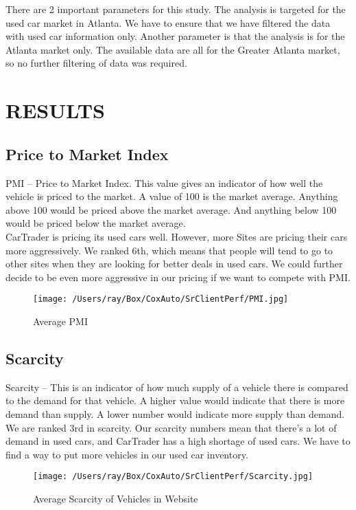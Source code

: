 \documentclass[
	12pt, %
	letterpaper, %
]{tPlate}
\begin{document}
There are 2 important parameters for this study.  The analysis is targeted for the used car market in Atlanta. We have to ensure that we have filtered the data with used car information only.  Another parameter is that the analysis is for the Atlanta market only.  The available data are all for the Greater Atlanta market, so no further filtering of data was required.

\section{RESULTS} 
\subsection{Price to Market Index}
PMI – Price to Market Index.  This value gives an indicator of how well the vehicle is priced to the market.  A value of 100 is the market average.  Anything above 100 would be priced above the market average.  And anything below 100 would be priced below the market average. \\

CarTrader is pricing its used cars well. However, more Sites are pricing their cars more aggressively.  We ranked 6th, which means that people will tend to go to other sites when they are looking for better deals in used cars.  We could further decide to be even more aggressive in our pricing if we want to compete with PMI.

\begin{figure}[H]
	\centering
	\texttt{[image: /Users/ray/Box/CoxAuto/SrClientPerf/PMI.jpg]}
	\caption[Optional caption]{Average PMI}
	\label{fig. 2}
\end{figure}

\subsection{Scarcity}
Scarcity – This is an indicator of how much supply of a vehicle there is compared to the demand for that vehicle.  A higher value would indicate that there is more demand than supply.  A lower number would indicate more supply than demand.\\

We are ranked 3rd in scarcity.  Our scarcity numbers mean that there's a lot of demand in used cars, and CarTrader has a high shortage of used cars.  We have to find a way to put more vehicles in our used car inventory.  

\begin{figure}[H]
	\centering
	\texttt{[image: /Users/ray/Box/CoxAuto/SrClientPerf/Scarcity.jpg]}
	\caption[Optional caption]{Average Scarcity of Vehicles in Website}
	\label{fig. 3}
\end{figure}
\end{document}

